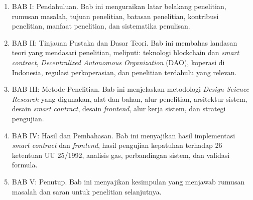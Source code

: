 \begin{enumerate}
	\item BAB I: Pendahuluan. Bab ini menguraikan latar belakang penelitian, rumusan masalah, tujuan penelitian, batasan penelitian, kontribusi penelitian, manfaat penelitian, dan sistematika penulisan.
	
	\item BAB II: Tinjauan Pustaka dan Dasar Teori. Bab ini membahas landasan teori yang mendasari penelitian, meliputi: teknologi blockchain dan \textit{smart contract}, \textit{Decentralized Autonomous Organization} (DAO), koperasi di Indonesia, regulasi perkoperasian, dan penelitian terdahulu yang relevan.
	
	\item BAB III: Metode Penelitian. Bab ini menjelaskan metodologi \textit{Design Science Research} yang digunakan, alat dan bahan, alur penelitian, arsitektur sistem, desain \textit{smart contract}, desain \textit{frontend}, alur kerja sistem, dan strategi pengujian.
	
	\item BAB IV: Hasil dan Pembahasan. Bab ini menyajikan hasil implementasi \textit{smart contract} dan \textit{frontend}, hasil pengujian kepatuhan terhadap 26 ketentuan UU 25/1992, analisis gas, perbandingan sistem, dan validasi formula.
	
	\item BAB V: Penutup. Bab ini menyajikan kesimpulan yang menjawab rumusan masalah dan saran untuk penelitian selanjutnya.
\end{enumerate}
